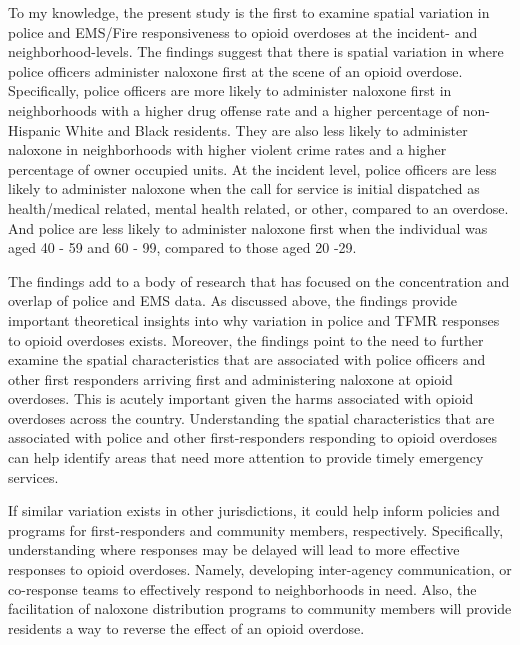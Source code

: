 To my knowledge, the present study is the first to examine spatial variation in police and EMS/Fire responsiveness to opioid overdoses at the incident- and neighborhood-levels. The findings suggest that there is spatial variation in where police officers administer naloxone first at the scene of an opioid overdose. Specifically, police officers are more likely to administer naloxone first in neighborhoods with a higher drug offense rate and a higher percentage of non-Hispanic White and Black residents. They are also less likely to administer naloxone in neighborhoods with higher violent crime rates and a higher percentage of owner occupied units. At the incident level, police officers are less likely to administer naloxone when the call for service is initial dispatched as health/medical related, mental health related, or other, compared to an overdose. And police are less likely to administer naloxone first when the individual was aged 40 - 59 and 60 - 99, compared to those aged 20 -29. 

The findings add to a body of research that has focused on the concentration and overlap of police and EMS data. As discussed above, the findings provide important theoretical insights into why variation in police and TFMR responses to opioid overdoses exists. Moreover, the findings point to the need to further examine the spatial characteristics that are associated with police officers and other first responders arriving first and administering naloxone at opioid overdoses. This is acutely important given the harms associated with opioid overdoses across the country. Understanding the spatial characteristics that are associated with police and other first-responders responding to opioid overdoses can help identify areas that need more attention to provide timely emergency services.

If similar variation exists in other jurisdictions, it could help inform policies and programs for first-responders and community members, respectively. Specifically, understanding where responses may be delayed will lead to more effective responses to opioid overdoses. Namely, developing inter-agency communication, or co-response teams to effectively respond to neighborhoods in need. Also, the facilitation of naloxone distribution programs to community members will provide residents a way to reverse the effect of an opioid overdose.

\newpage



\newpage 

